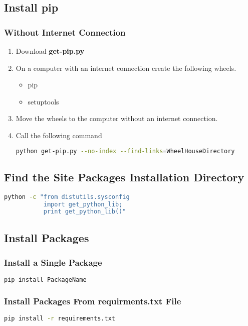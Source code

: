 \subsection{Install pip}
%
\subsubsection{Without Internet Connection}
\begin{enumerate}
  \item Download \textbf{get-pip.py}
  \item On a computer with an internet connection create the following wheels.
    \begin{itemize}
      \item pip
      \item setuptools
    \end{itemize}
  \item Move the wheels to the computer without an internet connection.
  \item Call the following command
\begin{lstlisting}[language=bash, numbers=none]
python get-pip.py --no-index --find-links=WheelHouseDirectory
\end{lstlisting}
\end{enumerate}

\subsection{Find the Site Packages Installation Directory}
\begin{lstlisting}[language=bash, numbers=none]
python -c "from distutils.sysconfig
           import get_python_lib;
           print get_python_lib()"
\end{lstlisting}

\subsection{Install Packages}
%
\subsubsection{Install a Single Package}
\begin{lstlisting}[language=bash, numbers=none]
pip install PackageName
\end{lstlisting}
%
\subsubsection{Install Packages From requirments.txt File}
\begin{lstlisting}[language=bash, numbers=none]
pip install -r requirements.txt
\end{lstlisting}
%
